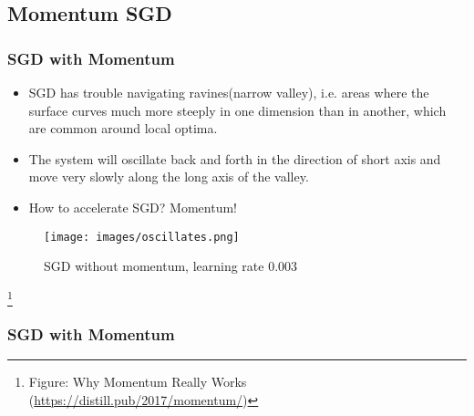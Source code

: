 \documentclass[10pt]{beamer}
\theoremstyle{mystyle}
\def\bb#1{\mathbf{#1}}
\newcommand{\bst}{\boldsymbol\theta}
\newcommand\blfootnote[1]{%
  \begingroup
  \renewcommand\thefootnote{}\footnote[frame]{#1}%
  \addtocounter{footnote}{-1}%
  \endgroup
}
\newenvironment{formula}[1]{%
  \setbeamercolor{block body}{bg=formula_body}
  \setbeamercolor{block title}{bg=formula_title,fg=white}
  \begin{minipage}{0.95\linewidth}
	\begin{block}{#1}
}{\end{block}\end{minipage}}
\theoremstyle{mystyle}
\begin{document}
\subsection{Momentum SGD}

\begin{frame}
	\frametitle{SGD with Momentum}
	\begin{itemize}
		\item SGD has trouble navigating ravines(narrow valley), i.e. areas where the surface curves much more steeply in one dimension than in another, which are common around local optima. 
		\item The system will oscillate back and forth in the direction of short axis and move very slowly along the long axis of the valley.
		\item How to accelerate SGD? Momentum!
	\end{itemize}

	\begin{figure}[H]
		\centering
		\texttt{[image: images/oscillates.png]}
		\caption{SGD without momentum, learning rate 0.003}
	\end{figure}
	\blfootnote{Figure: Why Momentum Really Works (\url{https://distill.pub/2017/momentum/})}
\end{frame}

\begin{frame}
	\frametitle{SGD with Momentum}
\end{frame}
\end{document}
